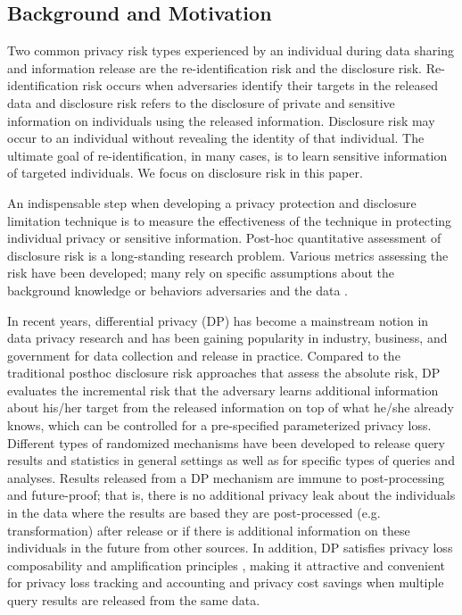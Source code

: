 \documentclass[10pt,journal,compsoc]{IEEEtran}
\begin{document}
\subsection{Background and Motivation}\vspace{-3pt}
Two common privacy risk types experienced by an individual during data sharing and information release are the re-identification risk and the  disclosure risk. Re-identification risk occurs when adversaries identify their targets in the released data and disclosure risk refers to the disclosure of private and sensitive information on individuals using the released information. Disclosure risk may occur to an individual without revealing the identity of that individual. The ultimate goal of re-identification, in many cases, is to learn sensitive information of targeted individuals. We focus on disclosure risk in this paper.

An indispensable step when developing a privacy protection and disclosure limitation technique is to  measure the effectiveness of the technique in protecting individual privacy or sensitive information. Post-hoc quantitative assessment of disclosure risk  is a long-standing research problem.  Various metrics assessing the risk have been developed; many rely on specific assumptions about the background knowledge or behaviors adversaries and the data  \citep{duncan1989risk, skinner2002measure, yancey2002disclosure, reiter2005estimating, hundepool2012statistical, hu2018bayesian}. 


In recent years, differential privacy (DP) \citep{dwork2006calibrating} has become a mainstream notion in data privacy research and has been gaining popularity in industry, business, and government for data collection and release in practice.  Compared to the traditional posthoc disclosure risk approaches that assess the absolute risk, DP evaluates the incremental risk that the adversary learns additional information about his/her target from the released information on top of what he/she already knows, which can be controlled for a  pre-specified parameterized privacy loss. Different types of randomized mechanisms have been developed to release query results and statistics in general settings as well as for specific types of queries and analyses. Results released from a DP mechanism are immune to post-processing and future-proof; that is, there is no additional privacy leak about the individuals in the data where the results are based they are post-processed  (e.g. transformation) after release or if there is additional information on these individuals in the future from other sources. In addition, DP satisfies privacy loss composability and  amplification principles \citep{mcsherry2007mechanism, dwork2010boosting, kasiviswanathan2011can, abadi2016deep, mironov2017renyi}, making it attractive and convenient for  privacy loss tracking and accounting and privacy cost savings when multiple query results are released from the same data. 
\end{document}
